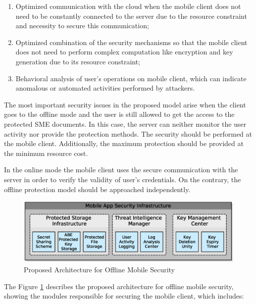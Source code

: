 \begin{enumerate}
	\item Optimized communication with the cloud when the mobile client does not need to be constantly connected to the server due to the resource constraint and necessity to secure this communication;
	\item Optimized combination of the security mechanisms so that the mobile client does not need to perform complex computation like encryption and key generation due to its resource constraint;
	\item Behavioral analysis of user's operations on mobile client, which can indicate anomalous or automated activities performed by attackers.
\end{enumerate}

The most important security issues in the proposed model arise when the client goes to the offline mode and the user is still allowed to get the access to the protected SME documents. In this case, the server can neither monitor the user activity nor provide the protection methods. The security should be performed at the mobile client. Additionally, the maximum protection should be provided at the minimum resource cost. 

In the online mode the mobile client uses the secure communication with the server in order to verify the validity of user’s credentials. On the contrary, the offline protection model should be approached independently.

\begin{figure}[h!]
	\centering
	\includegraphics[width=15cm]{figs/ch3/fig03.eps}
	\caption{Proposed Architecture for Offline Mobile Security}
	\label{fig:3_03}
\end{figure}

The Figure \ref{fig:3_03} describes the proposed architecture for offline mobile security, showing the modules responsible for securing the mobile client, which includes:

